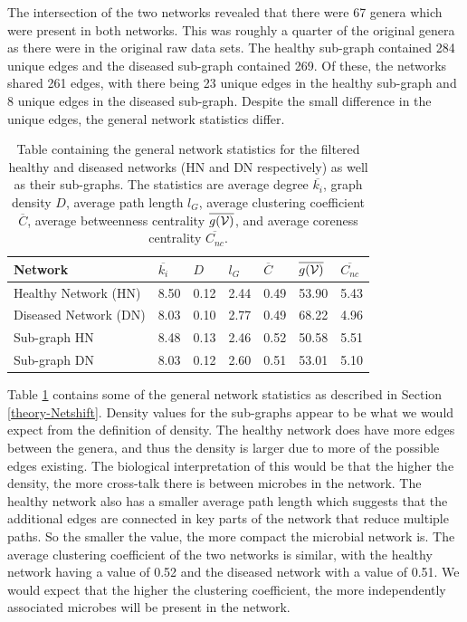 The intersection of the two networks revealed that there were 67 genera which were present in both networks. This was roughly a quarter of the original genera as there were in the original raw data sets. The healthy sub-graph contained 284 unique edges and the diseased sub-graph contained 269. Of these, the networks shared 261 edges, with there being 23 unique edges in the healthy sub-graph and 8 unique edges in the diseased sub-graph. Despite the small difference in the unique edges, the general network statistics differ. 

\begin{table}[hbt]
\centering
\begin{tabular}{l l l l l l l}
  \toprule
 Network & $\overline{k_i}$ & $D$ & $l_G$ & $\overline{C}$ & $\overline{g ( \mathcal{V} )}$  & $\overline{C_{nc}}$ \\ 
  \midrule
Healthy Network (HN) & 8.50 & 0.12 & 2.44 & 0.49 & 53.90 & 5.43 \\ 
  Diseased Network (DN) & 8.03 & 0.10 & 2.77 & 0.49 & 68.22 & 4.96 \\ 
  Sub-graph HN & 8.48 & 0.13 & 2.46 & 0.52 & 50.58 & 5.51 \\ 
  Sub-graph DN & 8.03 & 0.12 & 2.60 & 0.51 & 53.01 & 5.10 \\ 
   \bottomrule
\end{tabular}
\caption[Table containing the general network statistics for the filtered healthy and diseased networks (HN and DN respectively) as well as their sub-graphs.]{Table containing the general network statistics for the filtered healthy and diseased networks (HN and DN respectively) as well as their sub-graphs. The statistics are average degree $\overline{k_i}$,  graph density $D$, average path length $l_G$, average clustering coefficient $\overline{C}$, average betweenness centrality $\overline{g ( \mathcal{V} )}$, and average coreness centrality $\overline{C_{nc}}$. }
\label{tab:netstats}
\end{table}
Table \ref{tab:netstats} contains some of the general network statistics as described in Section \ref{theory-Netshift}. Density values for the sub-graphs appear to be what we would expect from the definition of density. The healthy network does have more edges between the genera, and thus the density is larger due to more of the possible edges existing. The biological interpretation of this would be that the higher the density, the more cross-talk there is between microbes in the network. The healthy network also has a smaller average path length which suggests that the additional edges are connected in key parts of the network that reduce multiple paths. So the smaller the value, the more compact the microbial network is. The average clustering coefficient of the two networks is similar, with the healthy network having a value of 0.52 and the diseased network with a value of 0.51. We would expect that the higher the clustering coefficient, the more independently associated microbes will be present in the network.

